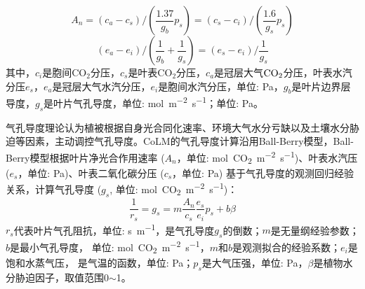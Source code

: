 \begin{equation}\label{A_n2}
A_{n}=\left(c_{a}-c_{s}\right) /\left(\frac{1.37}{g_{b}} p_{s}\right)=\left(c_{s}-c_{i}\right) /\left(\frac{1.6}{g_{s}} p_{s}\right)
\end{equation}
\begin{equation}\label{ea_ei}
\left(e_{a}-e_{i}\right) /\left(\frac{1}{g_{b}}+\frac{1}{g_{s}}\right)=\left(e_{s}-e_{i}\right) / \frac{1}{g_{s}}
\end{equation}
其中，$c_i$是胞间CO$_2$分压，$c_s$是叶表CO$_2$分压，$c_a$是冠层大气$\rm CO_2$分压，叶表水汽分压$e_s$，$e_a$是冠层大气水汽分压，$e_i$是胞间水汽分压，单位: Pa，$g_b$是叶片边界层导度，$g_s$是叶片气孔导度，单位: \unit{mol.m^{-2}.s^{-1}}；单位: Pa。

气孔导度理论认为植被根据自身光合同化速率、环境大气水分亏缺以及土壤水分胁迫等因素，主动调控气孔导度。CoLM的气孔导度计算沿用Ball-Berry模型，Ball-Berry模型根据叶片净光合作用速率 
($A_n$，单位: \unit{mol.CO_2.m^{-2}.s^{-1}})、叶表水汽压 ($e_s$，单位: Pa)、叶表二氧化碳分压 ($c_s$，单位: Pa) 
基于气孔导度的观测回归经验关系，计算气孔导度 ($g_s$, 单位: \unit{mol.CO_2.m^{-2}.s^{-1}})： 
\begin{equation}\label{rs_a1}
\frac{1}{r_{s}}=g_{s}=m \frac{A_{n}}{c_{s}} \frac{e_{s}}{e_{i}} p_{s}+b\beta
\end{equation}
$r_s$代表叶片气孔阻抗，单位: \unit{s.m^{-1}}，是气孔导度$g_s$的倒数；$m$是无量纲经验参数；$b$是最小气孔导度，
单位: \unit{mol.CO_2.m^{-2}.s^{-1}}，$m$和$b$是观测拟合的经验系数；$e_i$是饱和水蒸气压，
是气温的函数，单位: Pa；$p_s$是大气压强，单位: Pa，$\beta$是植物水分胁迫因子，取值范围0$\sim$1。


